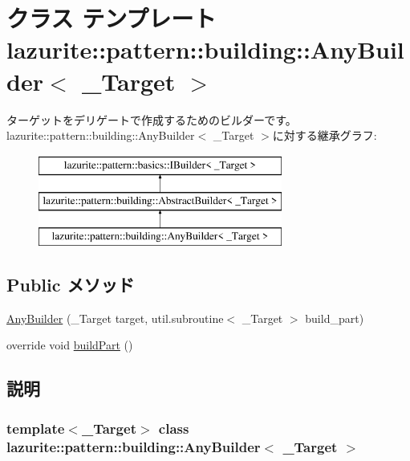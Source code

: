 \hypertarget{classlazurite_1_1pattern_1_1building_1_1_any_builder_3_01___target_01_4}{
\section{クラス テンプレート lazurite::pattern::building::AnyBuilder$<$ \_\-Target $>$}
\label{classlazurite_1_1pattern_1_1building_1_1_any_builder_3_01___target_01_4}
}


ターゲットをデリゲートで作成するためのビルダーです。  
lazurite::pattern::building::AnyBuilder$<$ \_\-Target $>$に対する継承グラフ:\begin{figure}[H]
\begin{center}
\leavevmode
\includegraphics[height=3cm]{classlazurite_1_1pattern_1_1building_1_1_any_builder_3_01___target_01_4}
\end{center}
\end{figure}
\subsection*{Public メソッド}
\begin{DoxyCompactItemize}
\item 
\hyperlink{classlazurite_1_1pattern_1_1building_1_1_any_builder_3_01___target_01_4_af0df2b6bcac7f0b4330e189504f2e747}{AnyBuilder} (\_\-Target target, util.subroutine$<$ \_\-Target $>$ build\_\-part)
\item 
override void \hyperlink{classlazurite_1_1pattern_1_1building_1_1_any_builder_3_01___target_01_4_a3c1f83ce10e846f83ab8f91d0a82300a}{buildPart} ()
\end{DoxyCompactItemize}


\subsection{説明}
\subsubsection*{template$<$\_\-Target$>$ class lazurite::pattern::building::AnyBuilder$<$ \_\-Target $>$}

